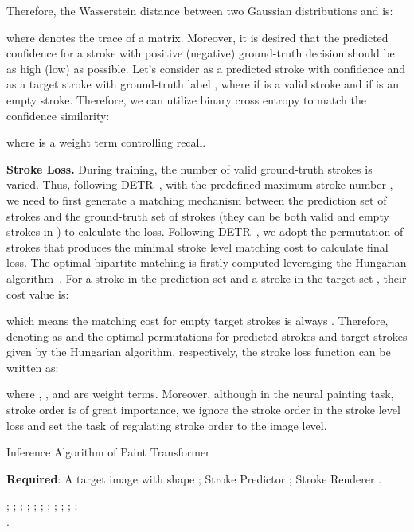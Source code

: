\documentclass[10pt,twocolumn,letterpaper]{article}
\begin{document}
Therefore, the Wasserstein distance between two Gaussian distributions  and  is:

where  denotes the trace of a matrix.
Moreover, it is desired that the predicted confidence for a stroke with positive (negative) ground-truth decision should be as high (low) as possible.
Let's consider  as a predicted stroke with confidence  and  as a target stroke with ground-truth label , where  if  is a valid stroke and  if  is an empty stroke.
Therefore, we can utilize binary cross entropy to match the confidence similarity:



where  is a weight term controlling recall.

\noindent
\textbf{Stroke Loss.}
During training, the number of valid ground-truth strokes is varied. Thus, following DETR~\cite{carion2020endtoend}, with the predefined maximum stroke number , we need to first generate a matching mechanism between the prediction set  of  strokes and the ground-truth set  of  strokes (they can be both valid and empty strokes in ) to calculate the loss. 
Following DETR~\cite{carion2020endtoend}, we adopt the permutation of strokes that produces the minimal stroke level matching cost to calculate final loss. 
The optimal bipartite matching is firstly computed leveraging the Hungarian algorithm~\cite{kuhn1955hungarian}.
For a stroke  in the prediction set  and a stroke  in the target set , their cost value is:


which means the matching cost for empty target strokes is always .
Therefore, denoting as  and  the optimal permutations for predicted strokes and target strokes given by the Hungarian algorithm, respectively, the stroke loss function can be written as:

where , , and  are weight terms.
Moreover, although in the neural painting task, stroke order is of great importance, we ignore the stroke order in the stroke level loss and set the task of regulating stroke order to the image level.



\begin{algorithm}[!t]
	\caption{Inference Algorithm of Paint Transformer}
    \textbf{Required}: A target image  with shape ; Stroke Predictor ; Stroke Renderer .
    \begin{algorithmic}[1]
        \State ;
        \State ;
        \State ;
        \For{}
            \State ;
            \State ;
            \State ;
            \State ;
            \State ;
            \State ;
            \State ;
        \EndFor
        \State ;\\
        \Return .
	\end{algorithmic}
	\label{inference}
	
\end{algorithm}
\end{document}
